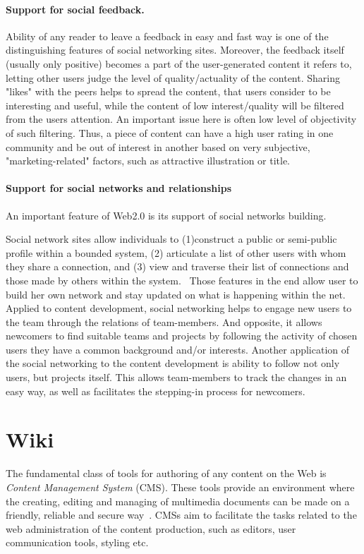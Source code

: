 \documentclass[ngerman,UKenglish,table]{scrbook}
\begin{document}
\paragraph{Support for social feedback.}
Ability of any reader to leave a feedback in easy and fast way is one of the distinguishing features of social networking sites.
Moreover, the feedback itself (usually only positive) becomes a part of the user-generated content it refers to, letting other users judge the level of quality/actuality of the content.
Sharing "likes" with the peers helps to spread the content, that users consider to be interesting and useful, while the content of low interest/quality will be filtered from the users attention. 
An important issue here is often low level of objectivity of such filtering.
Thus, a piece of content can have a high user rating in one community and be out of interest in another based on very subjective, "marketing-related" factors, such as attractive illustration or title.

\paragraph{Support for social networks and relationships}
An important feature of Web2.0 is its support of social networks building.

Social network sites allow individuals to (1)construct a public or semi-public profile within a bounded system, (2) articulate a list of other users with whom they share a connection, and (3) view and traverse their list of connections and those made by others within the system.~\cite{JCC4:JCC4393}
Those features in the end allow user to build her own network and stay updated on what is happening within the net.
Applied to content development, social networking helps to engage new users to the team through the relations of team-members.
And opposite, it allows newcomers to find suitable teams and projects by following the activity of chosen users they have a common background and/or interests.
Another application of the social networking to the content development is ability to follow not only users, but projects itself.
This allows team-members to track the changes in an easy way, as well as facilitates the stepping-in process for newcomers.


\section{Wiki}
\label{sec:wiki}
The fundamental class of tools for authoring of any content on the Web is \emph{Content Management System} (CMS).
These tools provide an environment where the creating, editing and managing of multimedia documents can be made on a friendly, reliable and secure way~\cite{Rivera2010}.
CMSs aim to facilitate the tasks related to the web administration of the content production, such as editors, user communication tools, styling etc.
\end{document}
